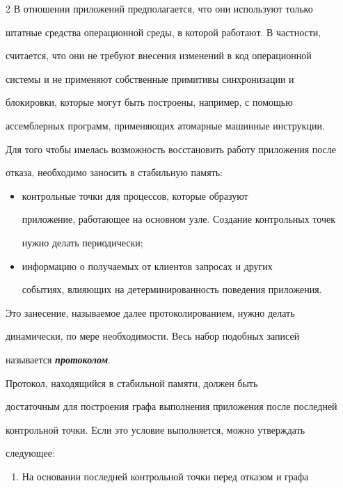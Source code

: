 \begin{multicols}{2}
В отношении приложений предполагается, что они используют только

штатные средства операционной среды, в которой работают. В частности,

считается, что они не требуют внесения изменений в код операционной

системы и не применяют собственные примитивы синхронизации и

блокировки, которые могут быть построены, например, с помощью

ассемблерных программ, применяющих атомарные машинные инструкции.



Для того чтобы имелась возможность восстановить работу приложения после

отказа, необходимо заносить в стабильную память:

\begin{itemize}

\item контрольные точки для процессов, которые образуют

приложение, работающее на основном узле. Создание контрольных точек

нужно делать периодически;

\item информацию о получаемых от клиентов запросах и других

событиях, влияющих на детерминированность поведения приложения.

\end{itemize}



Это занесение, называемое далее протоколированием, нужно делать

динамически, по мере необходимости. Весь набор подобных записей

называется {\bfseries\textit{протоколом}}.



Протокол, находящийся в стабильной памяти, должен быть

достаточным для построения графа выполнения приложения после последней

контрольной точки. Если это условие выполняется, можно утверждать

следующее:

\begin{enumerate}[1.]

\item На основании последней контрольной точки перед отказом и графа


\end{enumerate}
\end{multicols}
